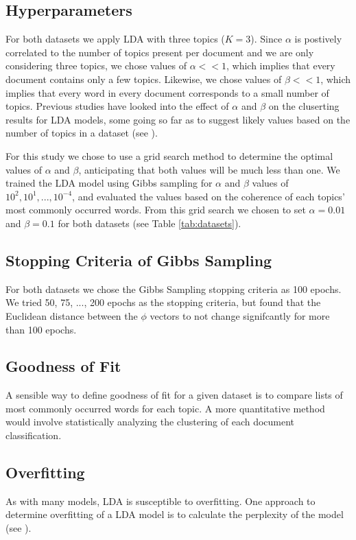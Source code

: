 \documentclass[10pt]{article}
\begin{document}
%
%
\subsection{Hyperparameters}
For both datasets we apply LDA with three topics ($K = 3$). Since $\alpha$ is postively correlated to the number of topics present per document and we are only considering three topics, we chose values of $\alpha << 1$, which implies that every document contains only a few topics. Likewise, we chose values of $\beta << 1$, which implies that every word in every document corresponds to a small number of topics. Previous studies have looked into the effect of $\alpha$ and $\beta$ on the cluserting results for LDA models, some going so far as to suggest likely values based on the number of topics in a dataset (see \cite{Griffiths2004}). 


For this study we chose to use a grid search method to determine the optimal values of $\alpha$ and $\beta$, anticipating that both values will be much less than one. We trained the LDA model using Gibbs sampling for $\alpha$ and $\beta$ values of $10^2, 10^1, ..., 10^{-4}$, and evaluated the values based on the coherence of each topics' most commonly occurred words. From this grid search we chosen to set $\alpha = 0.01$ and $\beta = 0.1$ for both datasets (see Table \ref{tab:datasets}).


%
%
\subsection{Stopping Criteria of Gibbs Sampling}
For both datasets we chose the Gibbs Sampling stopping criteria as 100 epochs. We tried 50, 75, ..., 200 epochs as the stopping criteria, but found that the Euclidean distance between the $\phi$ vectors to not change signifcantly for more than 100 epochs.

%
%
\subsection{Goodness of Fit}
A sensible way to define goodness of fit for a given dataset is to compare lists of most commonly occurred words for each topic. A more quantitative method would involve statistically analyzing the clustering of each document classification.

%
%
\subsection{Overfitting}
As with many models, LDA is susceptible to overfitting. One approach to determine overfitting of a LDA model is to calculate the perplexity of the model (see \cite{Heinrich}).
\end{document}
